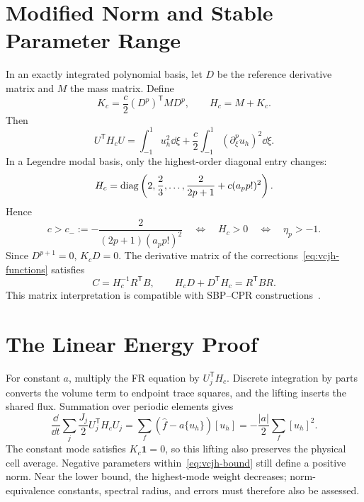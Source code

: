 \section{Modified Norm and Stable Parameter Range}
In an exactly integrated polynomial basis, let $D$ be the reference derivative matrix and $M$ the mass matrix. Define
\begin{equation}\label{eq:vcjh-norm}
K_c=\frac c2(D^p)^{\mathsf T}MD^p,\qquad H_c=M+K_c.
\end{equation}
Then
\[
U^{\mathsf T}H_cU
=\int_{-1}^1u_h^2\dd\xi
+\frac c2\int_{-1}^1(\partial_\xi^pu_h)^2\dd\xi.
\]
In a Legendre modal basis, only the highest-order diagonal entry changes:
\[
H_c=\operatorname{diag}\left(2,\frac23,\ldots,
\frac{2}{2p+1}+c(a_pp!)^2\right).
\]
Hence
\begin{equation}\label{eq:vcjh-bound}
c>c_-:=-\frac{2}{(2p+1)(a_pp!)^2}
\quad\Longleftrightarrow\quad H_c>0
\quad\Longleftrightarrow\quad\eta_p>-1.
\end{equation}
Since $D^{p+1}=0$, $K_cD=0$. The derivative matrix of the corrections~\eqref{eq:vcjh-functions} satisfies
\[
C=H_c^{-1}R^{\mathsf T}B,\qquad
H_cD+D^{\mathsf T}H_c=R^{\mathsf T}BR.
\]
This matrix interpretation is compatible with SBP--CPR constructions~\cite{ranocha2016}.

\section{The Linear Energy Proof}
For constant $a$, multiply the FR equation by $U_j^{\mathsf T}H_c$.
Discrete integration by parts converts the volume term to endpoint trace squares, and the lifting inserts the shared flux.
Summation over periodic elements gives
\[
\frac{\dd}{\dd t}\sum_j\frac{J_j}{2}U_j^{\mathsf T}H_cU_j
=\sum_f(\widehat f-a\{u_h\})[u_h]
=-\frac{|a|}{2}\sum_f[u_h]^2.
\]
The constant mode satisfies $K_c\bm1=0$, so this lifting also preserves the physical cell average.
Negative parameters within~\eqref{eq:vcjh-bound} still define a positive norm.
Near the lower bound, the highest-mode weight decreases; norm-equivalence constants, spectral radius, and errors must therefore also be assessed.


